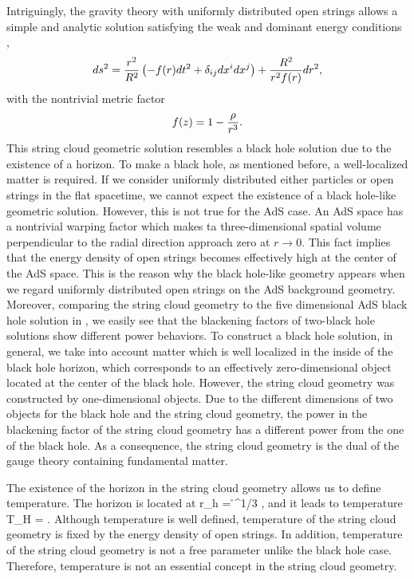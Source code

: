 \documentclass[12pt]{article}
\begin{document}
Intriguingly, the gravity theory with uniformly distributed open strings allows a simple and analytic solution satisfying the weak and dominant energy conditions \cite{Chakrabortty:2011sp,Chakrabortty:2016xcb},
\begin{equation}
ds^2 = \frac{r^2}{R^2} \left(- f(r) dt^2  + \delta_{ij} dx^i dx^j\right)  + \frac{R^2}{r^2 f(r)} dr^2,
\end{equation}
with the nontrivial metric factor 
\begin{equation}		\la{res:blackholefactor}
f(z) = 1  -  \fr{\r}{r^{3} } . %
\end{equation}
This string cloud geometric solution resembles a black hole solution due to the existence of a horizon. To make a black hole, as mentioned before, a well-localized matter is required. If we consider uniformly distributed either particles or open strings in the flat spacetime, we cannot expect the existence of a black hole-like geometric solution. However, this is not true for the AdS case. An AdS space has a nontrivial warping factor which makes ta three-dimensional spatial volume perpendicular to the radial direction approach zero at $r \to 0$. This fact implies that the energy density of open strings becomes effectively high at the center of the AdS space. This is the reason why the black hole-like geometry appears when we regard uniformly distributed open strings on the AdS background geometry. Moreover, comparing the string cloud geometry to the five dimensional AdS black hole solution in , we easily see that the blackening factors of two-black hole solutions show different power behaviors. To construct a black hole solution, in general, we take into account matter which is well localized in the inside of the black hole horizon, which corresponds to an effectively zero-dimensional object located at the center of the black hole. However, the string cloud geometry was constructed by one-dimensional objects. Due to the different dimensions of two objects for the black hole and the string cloud geometry, the power in the blackening factor of the string cloud geometry has a different power from the one of the black hole. As a consequence, the string cloud geometry is the dual of the gauge theory containing fundamental matter.

The existence of the horizon in the string cloud geometry allows us to define temperature. The horizon is located at
\be
r_h = \r^{1/3} ,
\ee
and it leads to temperature
\be
T_H =   .
\ee
Although temperature is well defined, temperature of the string cloud geometry is fixed by the energy density of open strings. In addition, temperature of the string cloud geometry is not a free parameter  
unlike the black hole case. Therefore, temperature is not an essential concept in the string cloud geometry. 
\end{document}
